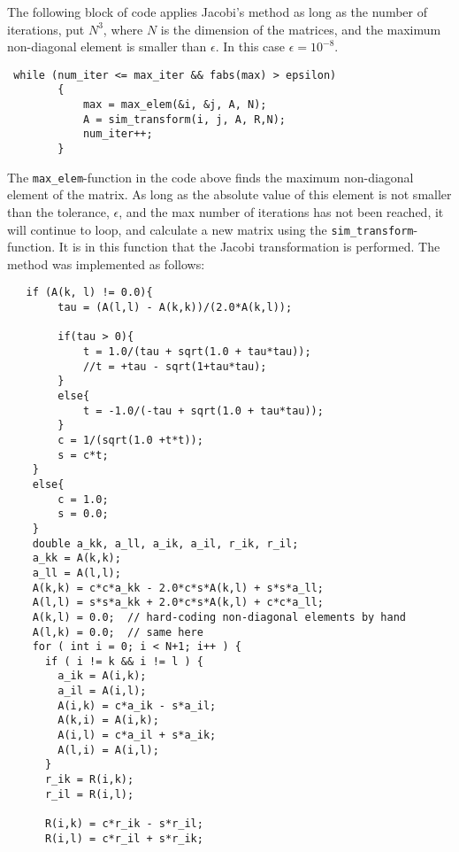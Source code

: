 \documentclass[12pt]{article}
\begin{document}
The following block of code applies Jacobi's method as long as the number of iterations, put $N^3$, where $N$ is the dimension of the  matrices, and the maximum non-diagonal element is smaller than $\epsilon$. In this case $\epsilon = 10^{-8}$. 

\begin{lstlisting}
 while (num_iter <= max_iter && fabs(max) > epsilon)
        {
            max = max_elem(&i, &j, A, N);
            A = sim_transform(i, j, A, R,N);
            num_iter++;
        }
\end{lstlisting}
The \lstinline{max_elem}-function in the code above finds the maximum non-diagonal element of the matrix. As long as the absolute value of this element is not smaller than the tolerance, $\epsilon$, and the max number of iterations has not been reached, it will continue to loop, and calculate a new matrix using the \lstinline{sim_transform}-function. It is in this function that the Jacobi transformation is performed. The method was implemented as follows:
\newline
\begin{lstlisting}
   if (A(k, l) != 0.0){
        tau = (A(l,l) - A(k,k))/(2.0*A(k,l));

        if(tau > 0){
            t = 1.0/(tau + sqrt(1.0 + tau*tau));
            //t = +tau - sqrt(1+tau*tau);
        }
        else{
            t = -1.0/(-tau + sqrt(1.0 + tau*tau));
        }
        c = 1/(sqrt(1.0 +t*t));
        s = c*t;
    }
    else{
        c = 1.0;
        s = 0.0;
    }
    double a_kk, a_ll, a_ik, a_il, r_ik, r_il;
    a_kk = A(k,k);
    a_ll = A(l,l);
    A(k,k) = c*c*a_kk - 2.0*c*s*A(k,l) + s*s*a_ll;
    A(l,l) = s*s*a_kk + 2.0*c*s*A(k,l) + c*c*a_ll;
    A(k,l) = 0.0;  // hard-coding non-diagonal elements by hand
    A(l,k) = 0.0;  // same here
    for ( int i = 0; i < N+1; i++ ) {
      if ( i != k && i != l ) {
        a_ik = A(i,k);
        a_il = A(i,l);
        A(i,k) = c*a_ik - s*a_il;
        A(k,i) = A(i,k);
        A(i,l) = c*a_il + s*a_ik;
        A(l,i) = A(i,l);
      }
      r_ik = R(i,k);
      r_il = R(i,l);

      R(i,k) = c*r_ik - s*r_il;
      R(i,l) = c*r_il + s*r_ik;
\end{lstlisting}
\end{document}
